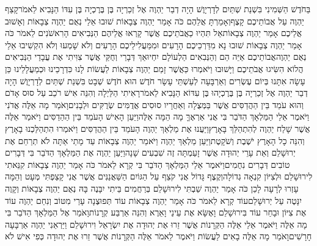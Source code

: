 \documentclass[../main/main.tex]{subfiles}
\begin{document}
\begin{multicols*}{\ncols}
בַּחֹדֶשׁ הַשְּׁמִינִי בִּשְׁנַת שְׁתַּיִם לְדָרְיָוֶשׁ הָיָה דְבַר יַהְוֶה אֶל זְכַרְיָה בֶּן בֶּרֶכְיָה בֶּן עִדּוֹ הַנָּבִיא לֵאמֹר\PreVerseSpace{}קָצַף יַהְוֶה עַל אֲבוֹתֵיכֶם קָצֶף\PreVerseSpace{}וְאָמַרְתָּ אֲלֵהֶם כֹּה אָמַר יַהְוֶה צְבָאוֹת שׁוּבוּ אֵלַי נְאֻם יַהְוֶה צְבָאוֹת וְאָשׁוּב אֲלֵיכֶם אָמַר יַהְוֶה צְבָאוֹת\PreVerseSpace{}אַל תִּהְיוּ כַאֲבֹתֵיכֶם אֲשֶׁר קָרְאוּ אֲלֵיהֶם הַנְּבִיאִים הָרִאשֹׁנִים לֵאמֹר כֹּה אָמַר יַהְוֶה צְבָאוֹת שׁוּבוּ נָא מִדַּרְכֵיכֶם הָרָעִים וּמִמַּעֲלִילֵיכֶם\SubEnd{} הָרָעִים וְלֹא שָׁמְעוּ וְלֹא הִקְשִׁיבוּ אֵלַי נְאֻם יַהְוֶה\PreVerseSpace{}אֲבוֹתֵיכֶם אַיֵּה הֵם וְהַנְּבִאִים הַלְעוֹלָם יִחְיוּ\PreVerseSpace{}אַךְ דְּבָרַי וְחֻקַּי אֲשֶׁר צִוִּיתִי אֶת עֲבָדַי הַנְּבִיאִים הֲלוֹא הִשִּׂיגוּ אֲבֹתֵיכֶם וַיָּשׁוּבוּ וַיֹּאמְרוּ כַּאֲשֶׁר זָמַם יַהְוֶה צְבָאוֹת לַעֲשׂוֹת לָנוּ כִּדְרָכֵינוּ וּכְמַעֲלָלֵינוּ כֵּן עָשָׂה אִתָּנוּ \ClosedSection{}בְּיוֹם עֶשְׂרִים וְאַרְבָּעָה לְעַשְׁתֵּי עָשָׂר חֹדֶשׁ הוּא חֹדֶשׁ שְׁבָט בִּשְׁנַת שְׁתַּיִם לְדָרְיָוֶשׁ הָיָה דְבַר יַהְוֶה אֶל זְכַרְיָה בֶּן בֶּרֶכְיָהוּ בֶּן עִדּוֹא הַנָּבִיא לֵאמֹר\PreVerseSpace{}רָאִיתִי הַלַּיְלָה וְהִנֵּה אִישׁ רֹכֵב עַל סוּס אָדֹם וְהוּא עֹמֵד בֵּין הַהֲדַסִּים אֲשֶׁר בַּמְּצֻלָה וְאַחֲרָיו סוּסִים אֲדֻמִּים שְׂרֻקִּים וּלְבָנִים\PreVerseSpace{}וָאֹמַר מָה אֵלֶּה אֲדֹנִי וַיֹּאמֶר אֵלַי הַמַּלְאָךְ הַדֹּבֵר בִּי אֲנִי אַרְאֶךָּ מָה הֵמָּה אֵלֶּה\PreVerseSpace{}וַיַּעַן הָאִישׁ הָעֹמֵד בֵּין הַהַדַסִּים וַיֹּאמַר אֵלֶּה אֲשֶׁר שָׁלַח יַהְוֶה לְהִתְהַלֵּךְ בָּאָרֶץ\PreVerseSpace{}וַיַּעֲנוּ אֶת מַלְאַךְ יַהְוֶה הָעֹמֵד בֵּין הַהֲדַסִּים וַיֹּאמְרוּ הִתְהַלַּכְנוּ בָאָרֶץ וְהִנֵּה כָל הָאָרֶץ יֹשֶׁבֶת וְשֹׁקָטֶת\PreVerseSpace{}וַיַּעַן מַלְאַךְ יַהְוֶה וַיֹּאמַר יַהְוֶה צְבָאוֹת עַד מָתַי אַתָּה לֹא תְרַחֵם אֶת יְרוּשָׁלֵם וְאֵת עָרֵי יְהוּדָה אֲשֶׁר זָעַמְתָּה זֶה שִׁבְעִים שָׁנָה\PreVerseSpace{}וַיַּעַן יַהְוֶה אֶת הַמַּלְאָךְ הַדֹּבֵר בִּי דְּבָרִים טוֹבִים דְּבָרִים נִחֻמִים\PreVerseSpace{}וַיֹּאמֶר אֵלַי הַמַּלְאָךְ הַדֹּבֵר בִּי קְרָא לֵאמֹר כֹּה אָמַר יַהְוֶה צְבָאוֹת קִנֵּאתִי לִירוּשָׁלֵם וּלְצִיּוֹן קִנְאָה גְדוֹלָה\PreVerseSpace{}וְקֶצֶף גָּדוֹל אֲנִי קֹצֵף עַל הַגּוֹיִם הַשַּׁאֲנַנִּים אֲשֶׁר אֲנִי קָצַפְתִּי מְּעָט וְהֵמָּה עָזְרוּ לְרָעָה \ClosedSection{}לָכֵן כֹּה אָמַר יַהְוֶה שַׁבְתִּי לִירוּשָׁלֵם בְּרַחֲמִים בֵּיתִי יִבָּנֶה בָּהּ נְאֻם יַהְוֶה צְבָאוֹת וְקָוֶה יִנָּטֶה עַל יְרוּשָׁלֵם\PreVerseSpace{}עוֹד קְרָא לֵאמֹר כֹּה אָמַר יַהְוֶה צְבָאוֹת עוֹד תְּפוּצֶנָה עָרַי מִטּוֹב וְנִחַם יַהְוֶה עוֹד אֶת צִיּוֹן וּבָחַר עוֹד בִּירוּשָׁלֵם \ClosedSection{}וָאֶשָּׂא אֶת עֵינַי וָאֵרֶא וְהִנֵּה אַרְבַּע קְרָנוֹת\PreVerseSpace{}וָאֹמַר אֶל הַמַּלְאָךְ הַדֹּבֵר בִּי מָה אֵלֶּה וַיֹּאמֶר אֵלַי אֵלֶּה הַקְּרָנוֹת אֲשֶׁר זֵרוּ אֶת יְהוּדָה אֶת יִשְׂרָאֵל וִירוּשָׁלֵם \ClosedSection{}וַיַּרְאֵנִי יַהְוֶה אַרְבָּעָה חָרָשִׁים\PreVerseSpace{}וָאֹמַר מָה אֵלֶּה בָאִים לַעֲשׂוֹת וַיֹּאמֶר לֵאמֹר אֵלֶּה הַקְּרָנוֹת אֲשֶׁר זֵרוּ אֶת יְהוּדָה כְּפִי אִישׁ לֹא 
\end{multicols*}
\end{document}
